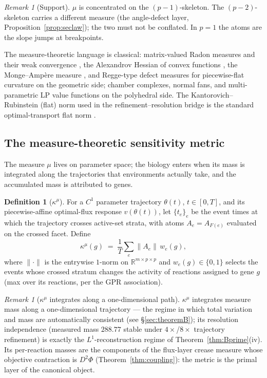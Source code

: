 \documentclass[11pt,a4paper]{article}
\theoremstyle{plain}
\theoremstyle{definition}
\newtheorem{definition}[theorem]{Definition}
\theoremstyle{remark}
\newtheorem{remark}[theorem]{Remark}
\newcommand{\kmu}{\kappa^{\mu}}
\newcommand{\RR}{\mathbb{R}}
\begin{document}
\begin{remark}[Support]\label{rem:support}
$\mu$ is concentrated on the $(p-1)$-skeleton. The $(p-2)$-skeleton carries
a different measure (the angle-defect layer,
Proposition~\ref{prop:seclaw}); the two must not be conflated. In $p=1$ the
atoms are the slope jumps at breakpoints.
\end{remark}

The measure-theoretic language is classical: matrix-valued Radon
measures and their weak convergence \citep{billingsley1999}, the
Alexandrov Hessian of convex functions \citep{alexandrov1939}, the
Monge--Amp\`ere measure \citep{gutierrez2001}, and Regge-type defect
measures for piecewise-flat curvature \citep{regge1961, cheeger1984} on
the geometric side; chamber complexes, normal fans, and multi-parametric
LP value functions \citep{rockafellar1970, ziegler1995, borrelli2003} on
the polyhedral side. The Kantorovich--Rubinstein (flat) norm used in the refinement--resolution bridge is the standard optimal-transport flat norm
\citep{villani2009}.

\subsection{The measure-theoretic sensitivity metric}

The measure $\mu$ lives on parameter space; the biology enters when
its mass is integrated along the trajectories that environments
actually take, and the accumulated mass is attributed to genes.

\begin{definition}[$\kmu$]\label{def:kmu}
For a $C^1$ parameter trajectory $\theta(t)$, $t \in [0,T]$, and its
piecewise-affine optimal-flux response $v(\theta(t))$, let
$\{t_e\}_e$ be the event times at which the trajectory crosses active-set
strata, with atoms $A_e = A_{F(e)}$ evaluated on the crossed facet. Define
\[
\kmu(g) \;=\; \frac{1}{T}\sum_{e} \bigl\| A_e \bigr\| \, w_e(g),
\]
where $\|{\cdot}\|$ is the entrywise $1$-norm on
$\RR^{m \times p \times p}$ and $w_e(g) \in \{0,1\}$ selects the events
whose crossed stratum changes the activity of reactions assigned to gene
$g$ (max over its reactions, per the GPR association).
\end{definition}

\begin{remark}[$\kmu$ integrates along a one-dimensional path]
$\kmu$ integrates measure mass along a one-dimensional trajectory --- the
regime in which total variation and mass are automatically
consistent (see \S\ref{sec:theoremB}); its resolution
independence (measured mass $288.77$ stable under $4\times$/$8\times$
trajectory refinement) is exactly the $L^1$-reconstruction regime of
Theorem~\ref{thm:Bprime}(iv). Its per-reaction masses are the components of the
flux-layer crease measure whose objective contraction is $D^2\Phi$
(Theorem~\ref{thm:coupling}): the metric is the primal layer of the
canonical object.
\end{remark}
\end{document}
